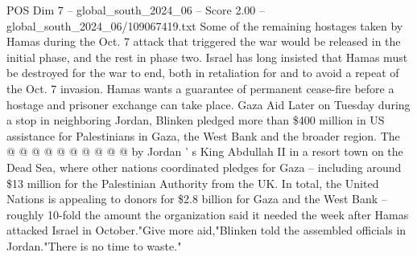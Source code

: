 \begin{textsample}{POS Dim 7 – global\_south\_2024\_06 – Score 2.00 – global\_south\_2024\_06/109067419.txt}
Some of the remaining hostages taken by Hamas during the Oct. 7 attack that triggered the war would be released in the initial phase, and the rest in phase two.
Israel has long insisted that Hamas must be destroyed for the war to end, both in retaliation for and to avoid a repeat of the Oct. 7 invasion.
Hamas wants a guarantee of permanent cease-fire before a hostage and prisoner exchange can take place.
Gaza Aid Later on Tuesday during a stop in neighboring Jordan, Blinken pledged more than \$400 million in US assistance for Palestinians in Gaza, the West Bank and the broader region.
The @ @ @ @ @ @ @ @ @ @ by Jordan ' s King Abdullah II in a resort town on the Dead Sea, where other nations coordinated pledges for Gaza -- including around \$13 million for the Palestinian Authority from the UK.
In total, the United Nations is appealing to donors for \$2.8 billion for Gaza and the West Bank -- roughly 10-fold the amount the organization said it needed the week after Hamas attacked Israel in October."Give more aid,"Blinken told the assembled officials in Jordan."There is no time to waste."

\end{textsample}
